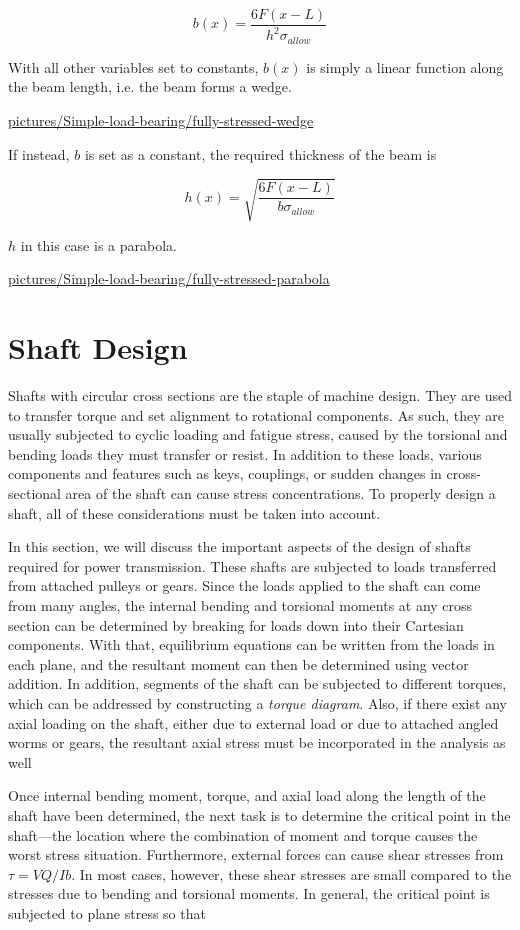 \documentclass[a4paper,openany,12pt]{book}
\begin{document}
{{$$b(x) = \dfrac{6F(x-L)}{h^2 \sigma_{allow}}$$

With all other variables set to constants, \(b(x)\) is simply a linear
function along the beam length, i.e. the beam forms a wedge.


\url{pictures/Simple-load-bearing/fully-stressed-wedge}

If instead, \(b\) is set as a constant, the required thickness of the beam
is

$$h(x) = \sqrt{\dfrac{6F(x-L)}{b \sigma_{allow}}}$$

\(h\) in this case is a parabola.


\url{pictures/Simple-load-bearing/fully-stressed-parabola}

\section{Shaft Design}
\label{sec:org11d4af5}
Shafts with circular cross sections are the staple of machine design.
They are used to transfer torque and set alignment to rotational
components. As such, they are usually subjected to cyclic loading and
fatigue stress, caused by the torsional and bending loads they must
transfer or resist. In addition to these loads, various components and
features such as keys, couplings, or sudden changes in cross-sectional
area of the shaft can cause stress concentrations. To properly design a
shaft, all of these considerations must be taken into account.

In this section, we will discuss the important aspects of the design of
shafts required for power transmission. These shafts are subjected to
loads transferred from attached pulleys or gears. Since the loads
applied to the shaft can come from many angles, the internal bending and
torsional moments at any cross section can be determined by breaking for
loads down into their Cartesian components. With that, equilibrium
equations can be written from the loads in each plane, and the resultant
moment can then be determined using vector addition. In addition,
segments of the shaft can be subjected to different torques, which can
be addressed by constructing a \emph{torque diagram}. Also, if there exist
any axial loading on the shaft, either due to external load or due to
attached angled worms or gears, the resultant axial stress must be
incorporated in the analysis as well

Once internal bending moment, torque, and axial load along the length of
the shaft have been determined, the next task is to determine the
critical point in the shaft---the location where the combination of
moment and torque causes the worst stress situation. Furthermore,
external forces can cause shear stresses from \(\tau = VQ/Ib\). In most
cases, however, these shear stresses are small compared to the stresses
due to bending and torsional moments. In general, the critical point is
subjected to plane stress so that


}}
\end{document}
